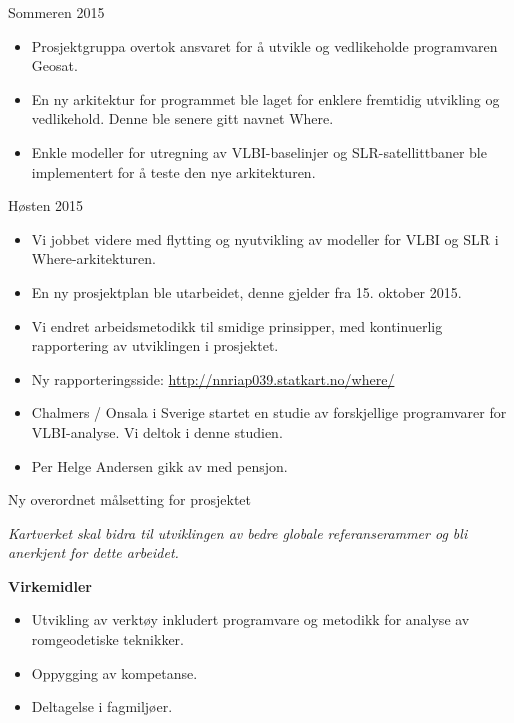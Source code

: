\documentclass[12pt,table,t]{beamer}
\begin{document}
\begin{frame}{Sommeren 2015}

  \begin{itemize}
  \item Prosjektgruppa overtok ansvaret for å utvikle og vedlikeholde programvaren Geosat.
  \item En ny arkitektur for programmet ble laget for enklere fremtidig utvikling og vedlikehold. Denne ble senere gitt
    navnet Where.
  \item Enkle modeller for utregning av VLBI-baselinjer og SLR-satellittbaner ble implementert for å teste den nye
    arkitekturen.
  \end{itemize}
\end{frame}


\begin{frame}{Høsten 2015}

  \begin{itemize}
  \item Vi jobbet videre med flytting og nyutvikling av modeller for VLBI og SLR i Where-arkitekturen.
  \item En ny prosjektplan ble utarbeidet, denne gjelder fra 15. oktober 2015.
  \item Vi endret arbeidsmetodikk til smidige prinsipper, med kontinuerlig rapportering av utviklingen i prosjektet.
  \item Ny rapporteringsside: \url{http://nnriap039.statkart.no/where/}
  \item Chalmers / Onsala i Sverige startet en studie av forskjellige programvarer for VLBI-analyse. Vi deltok i denne
    studien.
  \item Per Helge Andersen gikk av med pensjon.
  \end{itemize}
\end{frame}


\begin{frame}{Ny overordnet målsetting for prosjektet}

  {\large\itshape Kartverket skal bidra til utviklingen av bedre globale referanserammer og bli anerkjent for dette
    arbeidet.}
  \vspace*{2ex}
  \pause

  \textbf{Virkemidler}
  \begin{itemize}
  \item Utvikling av verktøy inkludert programvare og metodikk for analyse av romgeodetiske teknikker.
  \item Oppygging av kompetanse.
  \item Deltagelse i fagmiljøer.
  \end{itemize}
\end{frame}
\end{document}
